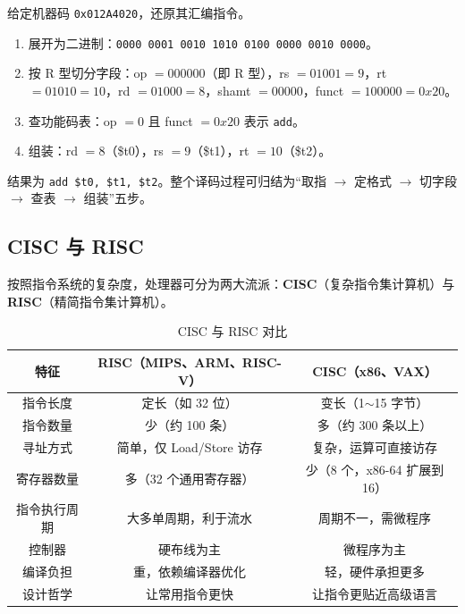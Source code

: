 \begin{example}
给定机器码 \texttt{0x012A4020}，还原其汇编指令。
\begin{enumerate}
    \item 展开为二进制：\texttt{0000 0001 0010 1010 0100 0000 0010 0000}。
    \item 按 R 型切分字段：op $=000000$（即 R 型），rs $=01001=9$，rt $=01010=10$，rd $=01000=8$，shamt $=00000$，funct $=100000=0x20$。
    \item 查功能码表：op $=0$ 且 funct $=0x20$ 表示 \texttt{add}。
    \item 组装：rd $=8$（\$t0），rs $=9$（\$t1），rt $=10$（\$t2）。
\end{enumerate}
结果为 \texttt{add \$t0, \$t1, \$t2}。整个译码过程可归结为“取指 $\to$ 定格式 $\to$ 切字段 $\to$ 查表 $\to$ 组装”五步。
\end{example}

\subsection{CISC 与 RISC}

按照指令系统的复杂度，处理器可分为两大流派：\textbf{CISC}（复杂指令集计算机）与 \textbf{RISC}（精简指令集计算机）。

\begin{table}[H]
\centering
\caption{CISC 与 RISC 对比}
\label{tab:risc_cisc}
\begin{tabulary}{\textwidth}{CCC}
\toprule
\textbf{特征} & \textbf{RISC（MIPS、ARM、RISC-V）} & \textbf{CISC（x86、VAX）} \\
\midrule
指令长度 & 定长（如 32 位） & 变长（1$\sim$15 字节） \\
指令数量 & 少（约 100 条） & 多（约 300 条以上） \\
寻址方式 & 简单，仅 Load/Store 访存 & 复杂，运算可直接访存 \\
寄存器数量 & 多（32 个通用寄存器） & 少（8 个，x86-64 扩展到 16） \\
指令执行周期 & 大多单周期，利于流水 & 周期不一，需微程序 \\
控制器 & 硬布线为主 & 微程序为主 \\
编译负担 & 重，依赖编译器优化 & 轻，硬件承担更多 \\
设计哲学 & 让常用指令更快 & 让指令更贴近高级语言 \\
\bottomrule
\end{tabulary}
\end{table}

